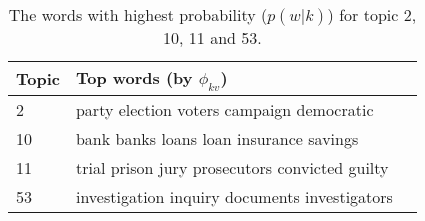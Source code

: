 \begin{table}[ht]
\centering
\begin{tabular}{llr}  
\toprule
Topic    & Top words (by $\phi_{kv}$) \\
\midrule
  2 & party election voters campaign democratic \\
 10 & bank banks loans loan insurance savings \\
 11 & trial prison jury prosecutors convicted guilty \\
 53 & investigation inquiry documents investigators \\
\bottomrule
\end{tabular}
\caption{The words with highest probability ($p(w|k)$) for topic 2, 10, 11 and 53.}
\label{example_top_words}
\end{table}
